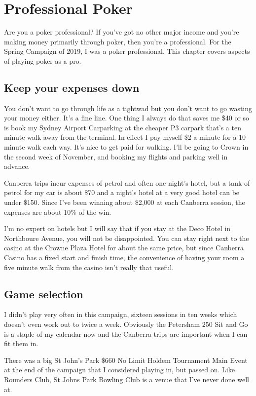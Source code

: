 \chapter{Professional Poker}

Are you a poker professional? If you've got no other major income and
you're making money primarily through poker, then you're a
professional. For the Spring Campaign of 2019, I was a poker
professional. This chapter covers aspects of playing poker as a pro.

\section*{Keep your expenses down}

You don't want to go through life as a tightwad but you don't want to
go wasting your money either. It's a fine line. One thing I always do
that saves me \$40 or so is book my Sydney Airport Carparking at the
cheaper P3 carpark that's a ten minute walk away from the
terminal. In effect I pay myself \$2 a minute for a 10 minute walk
each way. It's nice to get paid for walking. I'll be going to
Crown in the second week of November, and booking my flights and
parking well in advance.

Canberra trips incur expenses of petrol and often one night's hotel,
but a tank of petrol for my car is about \$70 and a night's hotel at
a very good hotel can be under \$150. Since I've been winning about
\$2,000 at each Canberra session, the expenses are about 10\% of
the win.

I'm no expert on hotels but I will say that if you stay at the Deco
Hotel in Northboure Avenue, you will not be disappointed. You can stay
right next to the casino at the Crowne Plaza Hotel for about the same
price, but since Canberra Casino has a fixed start and finish time,
the convenience of having your room a five minute walk from the casino
isn't really that useful.

\section*{Game selection}

I didn't play very often in this campaign, sixteen sessions in ten
weeks which doesn't even work out to twice a week. Obviously the
Petersham 250 Sit and Go is a staple of my calendar now and the
Canberra trips are important when I can fit them in.

There was a big St John's Park \$660 No Limit Holdem Tournament Main
Event at the end of the campaign that I considered playing in, but
passed on. Like Rounders Club, St Johns Park Bowling Club is
a venue that I've never done well at.

